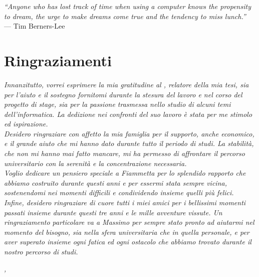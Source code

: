 
\cleardoublepage
{}
{}

\begin{flushright}{
	\slshape    
	``Anyone who has lost track of time when using a computer knows the propensity to dream, the urge to make dreams come true and the tendency to miss lunch.''} \\ 
	\medskip
	--- Tim Berners-Lee
\end{flushright}

\bigskip

\begingroup
\let\clearpage\relax
\let\cleardoublepage\relax
\let\cleardoublepage\relax

\chapter*{Ringraziamenti}

\noindent \textit{Innanzitutto, vorrei esprimere la mia gratitudine al \profTitle{} \myProf, relatore della mia tesi, sia per l'aiuto e il sostegno fornitomi durante la stesura del lavoro e nel corso del progetto di stage, sia per la passione trasmessa nello studio di alcuni temi dell'informatica. La dedizione nei confronti del suo lavoro è stata per me stimolo ed ispirazione.}\\

\noindent \textit{Desidero ringraziare con affetto la mia famiglia per il supporto, anche economico, e il grande aiuto che mi hanno dato durante tutto il periodo di studi. La stabilità, che non mi hanno mai fatto mancare, mi ha permesso di affrontare il percorso universitario con la serenità e la concentrazione necessaria.}\\

\noindent \textit{Voglio dedicare un pensiero speciale a Fiammetta per lo splendido rapporto che abbiamo costruito durante questi anni e per essermi stata sempre vicina, sostenendomi nei momenti difficili e condividendo insieme quelli più felici.}\\

\noindent \textit{Infine, desidero ringraziare di cuore tutti i miei amici per i bellissimi momenti passati insieme durante questi tre anni e le mille avventure vissute. Un ringraziamento particolare va a Massimo per sempre stato pronto ad aiutarmi nel momento del bisogno, sia nella sfera universitaria che in quella personale, e per aver superato insieme ogni fatica ed ogni ostacolo che abbiamo trovato durante il nostro percorso di studi.}\\
\bigskip

\noindent\textit{\myLocation, \myTime}
\hfill \myName

\endgroup

